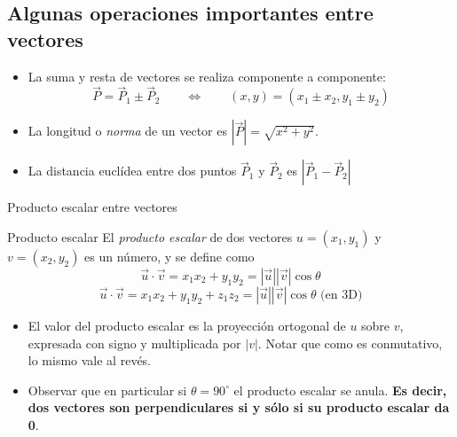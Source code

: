 \documentclass[compress]{beamer}
\newcommand{\be}{\begin{equation*}}
\newcommand{\ee}{\end{equation*}}
\begin{document}
\subsection{Algunas operaciones importantes entre vectores}

\begin{frame}
\begin{itemize}
\item La suma y resta de vectores se realiza componente a componente:
    \be
    \vec{P} = \vec{P}_1 \pm \vec{P}_2  \qquad \Longleftrightarrow \qquad (x, y) = (x_1 \pm x_2, y_1 \pm y_2)
    \ee
    \vspace{0.25cm}
    \item La longitud o \emph{norma} de un vector es $|\vec{P}| = \sqrt{x^2 + y^2}$.
\vspace{0.25cm}
    \item La distancia eucl\'idea entre dos puntos $\vec{P}_1$ y $\vec{P}_2$ es $|\vec{P}_1 - \vec{P}_2|$
\end{itemize}
\end{frame}

\begin{frame}{Producto escalar entre vectores}

\begin{block}{Producto escalar}
El \emph{producto escalar} de dos vectores $u = (x_1,y_1)$ y $v = (x_2,y_2)$ es un n\'umero, y se define como
    \be
    \vec{u} \cdot \vec{v} = x_1 x_2 + y_1 y_2 = |\vec{u}| |\vec{v}| \cos\theta
    \ee
    \be
    \vec{u} \cdot \vec{v} = x_1 x_2 + y_1 y_2 + z_1 z_2 = |\vec{u}| |\vec{v}| \cos\theta \mbox{  (en 3D)}
    \ee
\end{block}

\begin{itemize}
    \item El valor del producto escalar es la proyección ortogonal de $u$ sobre $v$, expresada con signo y multiplicada por $|v|$. Notar que como es conmutativo, lo mismo vale al revés.
    \item Observar que en particular si $\theta = 90^\circ$ el producto escalar se anula.
    \textbf{Es decir, dos vectores son perpendiculares si y s\'olo si su producto escalar da 0}.
\end{itemize}

\end{frame}
\end{document}
